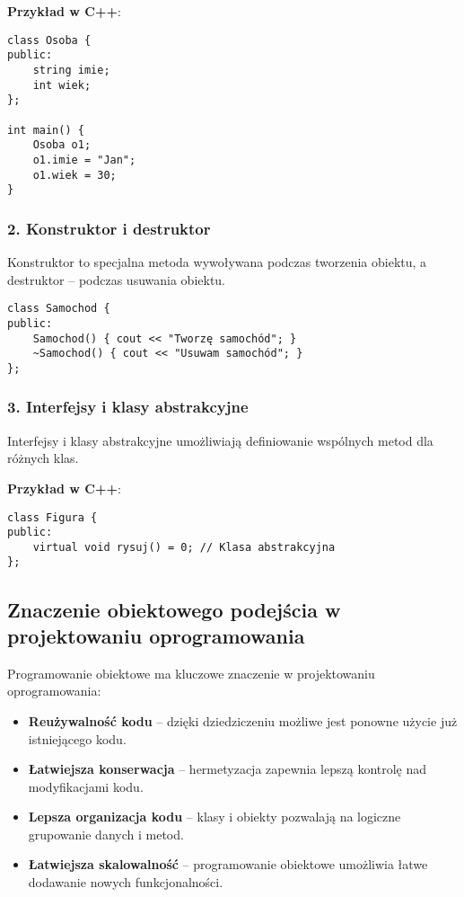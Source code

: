 \textbf{Przykład w C++}:
\begin{verbatim}
class Osoba {
public:
    string imie;
    int wiek;
};

int main() {
    Osoba o1;
    o1.imie = "Jan";
    o1.wiek = 30;
}
\end{verbatim}

\subsubsection{2. Konstruktor i destruktor}
Konstruktor to specjalna metoda wywoływana podczas tworzenia obiektu, a destruktor – podczas usuwania obiektu.

\begin{verbatim}
class Samochod {
public:
    Samochod() { cout << "Tworzę samochód"; }
    ~Samochod() { cout << "Usuwam samochód"; }
};
\end{verbatim}

\subsubsection{3. Interfejsy i klasy abstrakcyjne}
Interfejsy i klasy abstrakcyjne umożliwiają definiowanie wspólnych metod dla różnych klas.

\textbf{Przykład w C++}:
\begin{verbatim}
class Figura {
public:
    virtual void rysuj() = 0; // Klasa abstrakcyjna
};
\end{verbatim}

\subsection{Znaczenie obiektowego podejścia w projektowaniu oprogramowania}
Programowanie obiektowe ma kluczowe znaczenie w projektowaniu oprogramowania:
\begin{itemize}
    \item \textbf{Reużywalność kodu} – dzięki dziedziczeniu możliwe jest ponowne użycie już istniejącego kodu.
    \item \textbf{Łatwiejsza konserwacja} – hermetyzacja zapewnia lepszą kontrolę nad modyfikacjami kodu.
    \item \textbf{Lepsza organizacja kodu} – klasy i obiekty pozwalają na logiczne grupowanie danych i metod.
    \item \textbf{Łatwiejsza skalowalność} – programowanie obiektowe umożliwia łatwe dodawanie nowych funkcjonalności.
\end{itemize}

